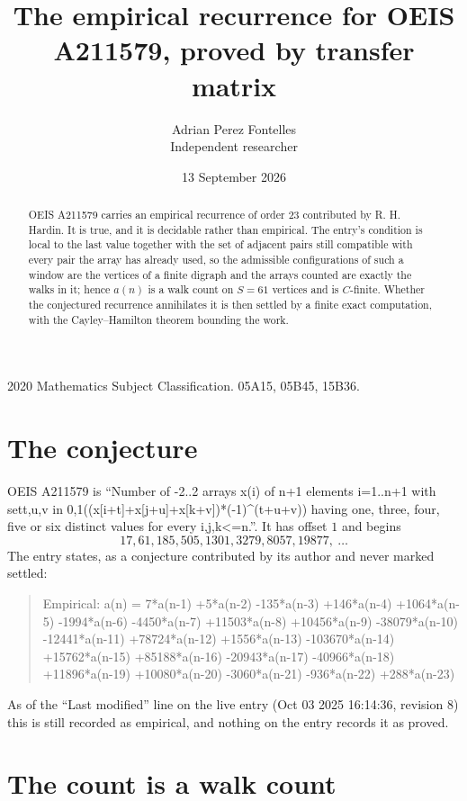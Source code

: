 \documentclass[11pt,a4paper]{article}
\title{The empirical recurrence for OEIS A211579, proved by transfer matrix}
\author{Adrian Perez Fontelles\\ \small Independent researcher}
\date{13 September 2026}
\theoremstyle{plain}
\theoremstyle{definition}
\begin{document}
\maketitle

\begin{abstract}
OEIS A211579 carries an empirical recurrence of order $23$ contributed by R. H. Hardin. It is
true, and it is decidable rather than empirical. The entry's condition is local to the last value together with the set of adjacent pairs still compatible with every pair the array has already used, so
the admissible configurations of such a window are the vertices of a finite digraph and the
arrays counted are exactly the walks in it; hence $a(n)$ is a walk count on $S=61$ vertices
and is $C$-finite. Whether the conjectured recurrence annihilates it is then settled by a
finite exact computation, with the Cayley--Hamilton theorem bounding the work.
\end{abstract}

\noindent\small 2020 Mathematics Subject Classification. 05A15, 05B45, 15B36.\normalsize

\section{The conjecture}

OEIS A211579 is ``Number of -2..2 arrays x(i) of n+1 elements i=1..n+1 with set{t,u,v in 0,1}((x[i+t]+x[j+u]+x[k+v])*(-1)\^{}(t+u+v)) having one, three, four, five or six distinct values for every i,j,k<=n.''. It has offset $1$ and begins
\[
17, 61, 185, 505, 1301, 3279, 8057, 19877,\ \dots
\]
The entry states, as a conjecture contributed by its author and never marked settled:
\begin{quote}
Empirical: a(n) = 7*a(n-1) +5*a(n-2) -135*a(n-3) +146*a(n-4) +1064*a(n-5) -1994*a(n-6) -4450*a(n-7) +11503*a(n-8) +10456*a(n-9) -38079*a(n-10) -12441*a(n-11) +78724*a(n-12) +1556*a(n-13) -103670*a(n-14) +15762*a(n-15) +85188*a(n-16) -20943*a(n-17) -40966*a(n-18) +11896*a(n-19) +10080*a(n-20) -3060*a(n-21) -936*a(n-22) +288*a(n-23)
\end{quote}
As of the ``Last modified'' line on the live entry (Oct 03 2025 16:14:36, revision 8) this is still
recorded as empirical, and nothing on the entry records it as proved.

\section{The count is a walk count}
\end{document}
